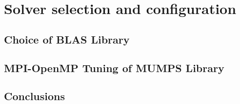 \chapter{Solver selection and configuration}
\label{chapter:solver configuration}
























\section{Choice of BLAS Library}
\label{subseq:blas-comparison}




\section{MPI-OpenMP Tuning of MUMPS Library}
\label{subseq:mpi-openmp}


\section{Conclusions}
\label{subseq:conclusions}







